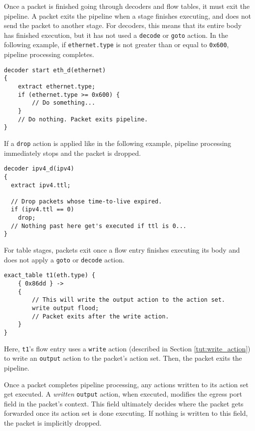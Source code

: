Once a packet is finished going through decoders and flow tables, it must exit the pipeline.
A packet exits the pipeline when
a stage finishes executing, and does not send the packet to another stage. For
decoders, this means that its entire body has finished execution, but it has not
used a \texttt{decode} or \texttt{goto} action. In the following example, if
\texttt{ethernet.type} is not greater than or equal to \texttt{0x600}, pipeline
processing completes.

\begin{codepage}
\begin{lstlisting}
decoder start eth_d(ethernet)
{
	extract ethernet.type;
	if (ethernet.type >= 0x600) {
		// Do something...
	}
	// Do nothing. Packet exits pipeline.
}
\end{lstlisting}
\end{codepage}

If a \texttt{drop} action is applied like in the following example, pipeline processing
immediately stops and the packet is dropped.

\begin{codepage}
\begin{lstlisting}
decoder ipv4_d(ipv4)
{
  extract ipv4.ttl;

  // Drop packets whose time-to-live expired.
  if (ipv4.ttl == 0)
  	drop;
  // Nothing past here get's executed if ttl is 0...
}
\end{lstlisting}
\end{codepage}

For table stages, packets exit once a flow entry finishes executing its body and
does not apply a \texttt{goto} or \texttt{decode} action.

\begin{codepage}
\begin{lstlisting}
exact_table t1(eth.type) {
	{ 0x86dd } ->
	{
		// This will write the output action to the action set.
		write output flood;
		// Packet exits after the write action.
	}
}
\end{lstlisting}
\end{codepage}

Here, \texttt{t1}'s flow entry uses a \texttt{write} action (described in Section
\ref{tut:write_action}) to write an \texttt{output} action to the packet's action set.
Then, the packet exits the pipeline.

Once a packet completes pipeline processing, any actions written to its action
set get executed. A \textit{written} \texttt{output} action, when executed, modifies the
egress port field in the packet's context. This field ultimately decides where
the packet gets forwarded once its action set is done executing. If nothing is
written to this field, the packet is implicitly dropped.


